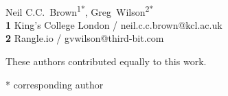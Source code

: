 \documentclass[10pt,letterpaper]{article}
\date{}
\begin{document}
\vspace*{0.2in}

\begin{flushleft}
{\Large
\textbf{} %
}
\newline
\\
{Neil C.C.\ Brown}\textsuperscript{1{\ddag}*},
{Greg~Wilson}\textsuperscript{2{\ddag}*}
\\
\bigskip
\textbf{1} King's College London / neil.c.c.brown@kcl.ac.uk \\
\textbf{2} Rangle.io / gvwilson@third-bit.com \\

\bigskip

%
%
{\ddag} These authors contributed equally to this work.





* corresponding author

\end{flushleft}


\end{document}
